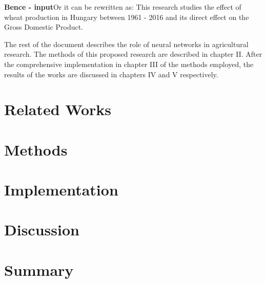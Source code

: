 \documentclass[
]{thesis-ekf}
\begin{document}
\textbf{Bence - input}Or it can be rewritten as: This research studies the effect of wheat production in Hungary between 1961 - 2016 and its direct effect on the Gross Domestic Product.

The rest of the document describes the role of neural networks in agricultural research. The methods of this proposed research are described in chapter II. After the comprehensive implementation in chapter III of the methods employed, the results of the works are discussed in chapters IV and V respectively.





\chapter{Related Works}




\chapter{Methods}


\chapter{Implementation}


\chapter{Discussion}



\chapter{Summary}







\end{document}
